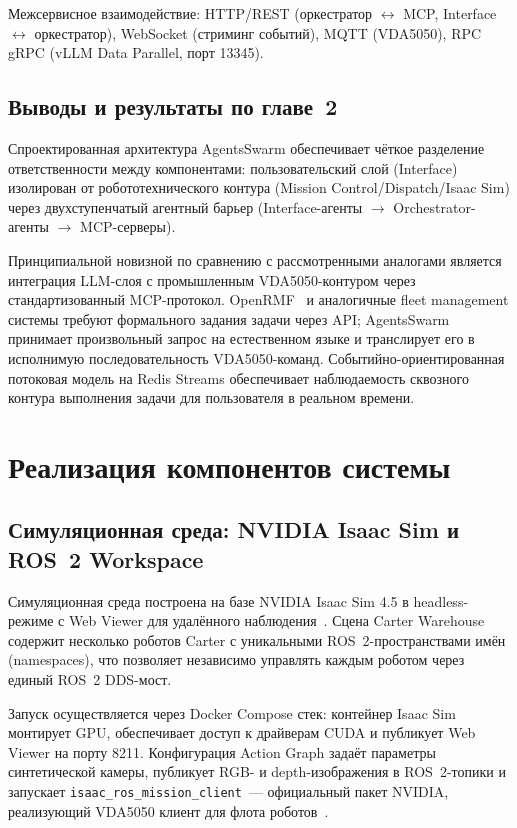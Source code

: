\documentclass[14pt,a4paper]{extreport}
\begin{document}
Межсервисное взаимодействие: HTTP/REST (оркестратор $\leftrightarrow$ MCP, Interface $\leftrightarrow$ оркестратор), WebSocket (стриминг событий), MQTT (VDA5050), RPC gRPC (vLLM Data Parallel, порт 13345).

\section{Выводы и результаты по главе~2}

Спроектированная архитектура AgentsSwarm обеспечивает чёткое разделение ответственности между компонентами: пользовательский слой (Interface) изолирован от робототехнического контура (Mission Control/Dispatch/Isaac Sim) через двухступенчатый агентный барьер (Interface-агенты $\to$ Orchestrator-агенты $\to$ MCP-серверы).

Принципиальной новизной по сравнению с рассмотренными аналогами является интеграция LLM-слоя с промышленным VDA5050-контуром через стандартизованный MCP-протокол. OpenRMF~\cite{openrmf} и аналогичные fleet management системы требуют формального задания задачи через API; AgentsSwarm принимает произвольный запрос на естественном языке и транслирует его в исполнимую последовательность VDA5050-команд. Событийно-ориентированная потоковая модель на Redis Streams обеспечивает наблюдаемость сквозного контура выполнения задачи для пользователя в реальном времени.

\chapter{Реализация компонентов системы}

\section{Симуляционная среда: NVIDIA Isaac Sim и ROS~2 Workspace}

Симуляционная среда построена на базе NVIDIA Isaac Sim 4.5 в headless-режиме с Web Viewer для удалённого наблюдения~\cite{nvidia2024isaac,isaacsim_multirobot}. Сцена Carter Warehouse содержит несколько роботов Carter с уникальными ROS~2-пространствами имён (namespaces), что позволяет независимо управлять каждым роботом через единый ROS~2 DDS-мост.

Запуск осуществляется через Docker Compose стек: контейнер Isaac Sim монтирует GPU, обеспечивает доступ к драйверам CUDA и публикует Web Viewer на порту 8211. Конфигурация Action Graph задаёт параметры синтетической камеры, публикует RGB- и depth-изображения в ROS~2-топики и запускает \texttt{isaac\_ros\_mission\_client}~--- официальный пакет NVIDIA, реализующий VDA5050 клиент для флота роботов~\cite{isaacros_packages}.
\end{document}

